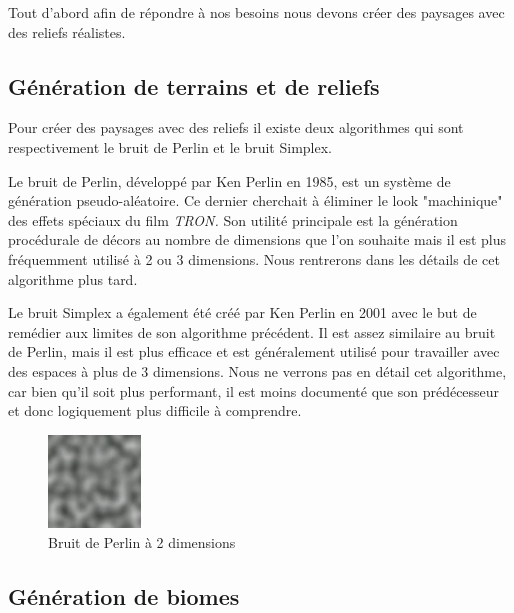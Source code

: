 \documentclass{article}
\begin{document}
Tout d'abord afin de répondre à nos besoins nous devons créer des paysages avec des reliefs réalistes.

\subsection{Génération de terrains et de reliefs}

Pour créer des paysages avec des reliefs il existe deux algorithmes qui sont respectivement le bruit de Perlin et le bruit Simplex.

Le bruit de Perlin, développé par Ken Perlin en 1985, est un système de génération pseudo-aléatoire. Ce dernier cherchait à éliminer le look "machinique" des effets spéciaux du film \textit{TRON.} Son utilité principale est la génération procédurale de décors au nombre de dimensions que l'on souhaite mais il est plus fréquemment utilisé à 2 ou 3 dimensions. Nous rentrerons dans les détails de cet algorithme plus tard.\par
Le bruit Simplex a également été créé par Ken Perlin en 2001 avec le but de remédier aux limites de son algorithme précédent. Il est assez similaire au bruit de Perlin, mais il est plus efficace et est généralement utilisé pour travailler avec des espaces à plus de 3 dimensions. Nous ne verrons pas en détail cet algorithme, car bien qu'il soit plus performant, il est moins documenté que son prédécesseur et donc logiquement plus difficile à comprendre.
\begin{figure} %
  \centering
  \includegraphics[width=0.22\textwidth]{assets/Perlin_noise.jpg}
  \caption{Bruit de Perlin à 2 dimensions}
  \label{perlin}
\end{figure}

\subsection{Génération de biomes}
\end{document}
